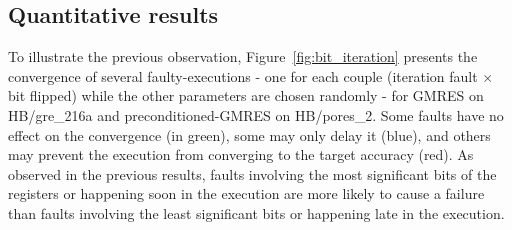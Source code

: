 \documentclass[twoside]{article}
\newcounter{fig}\setcounter{fig}{0}
\begin{document}
  \subsection{Quantitative results}

  To illustrate the previous observation, Figure~\ref{fig:bit_iteration} presents the convergence of several faulty-executions - one for each couple (iteration fault $\times$ bit flipped) while the other parameters are chosen randomly - for GMRES on HB/gre_216a and preconditioned-GMRES on HB/pores_2. Some faults have no effect on the convergence (in green), some may only delay it (blue), and others may prevent the execution from converging to the target accuracy (red). As observed in the previous results, faults involving the most significant bits of the registers or happening soon in the execution are more likely to cause a failure than faults involving the least significant bits or happening late in the execution.
\end{document}
